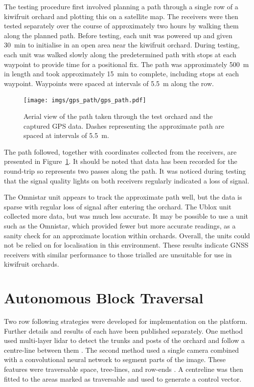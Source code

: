 \documentclass[preprint,authoryear,12pt]{elsarticle}
\begin{document}
        The testing procedure first involved planning a path through a single row of a kiwifruit orchard and plotting this on a satellite map.
        The receivers were then tested separately over the course of approximately two hours by walking them along the planned path.
        Before testing, each unit was powered up and given \SI{30}{\minute} to initialise in an open area near the kiwifruit orchard.
        During testing, each unit was walked slowly along the predetermined path with stops at each waypoint to provide time for a positional fix.
        The path was approximately \SI{500}{\meter} in length and took approximately \SI{15}{\minute} to complete, including stops at each waypoint.
        Waypoints were spaced at intervals of \SI{5.5}{\meter} along the row.

        \begin{figure}[htb]
            \centering
            \texttt{[image: imgs/gps\_path/gps\_path.pdf]}
            \caption{
                Aerial view of the path taken through the test orchard and the captured GPS data.
                Dashes representing the approximate path are spaced at intervals of \SI{5.5}{\meter}.
            }
            \label{fig:gpsResults}
        \end{figure}

        The path followed, together with coordinates collected from the receivers, are presented in Figure~\ref{fig:gpsResults}.
        It should be noted that data has been recorded for the round-trip so represents two passes along the path.
        It was noticed during testing that the signal quality lights on both receivers regularly indicated a loss of signal.

        The Omnistar unit appears to track the approximate path well, but the data is sparse with regular loss of signal after entering the orchard.
    	The Ublox unit collected more data, but was much less accurate.
        It may be possible to use a unit such as the Omnistar, which provided fewer but more accurate readings, as a sanity check for an approximate location within orchards.
        Overall, the units could not be relied on for localisation in this environment.
        These results indicate GNSS receivers with similar performance to those trialled are unsuitable for use in kiwifruit orchards.


\section{Autonomous Block Traversal}
\label{sect:autonomous}
    Two row following strategies were developed for implementation on the platform.
    Further details and results of each have been published separately.
    One method used multi-layer lidar to detect the trunks and posts of the orchard and follow a centre-line between them \citep{Bell2016}.
    The second method used a single camera combined with a convolutional neural network to segment parts of the image.
    These features were traversable space, tree-lines, and row-ends \citep{Bell2017}.
    A centreline was then fitted to the areas marked as traversable and used to generate a control vector.
\end{document}

